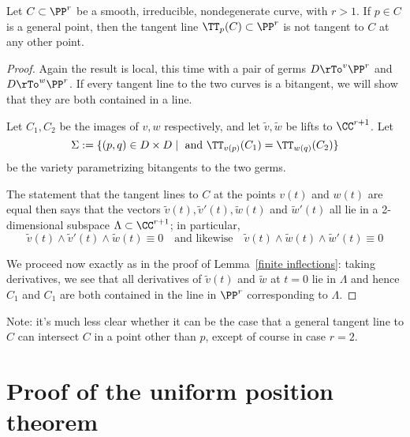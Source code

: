  \begin{lemma}\label{tangent not bitangent}
 Let $C \subset \PP^r$ be a smooth, irreducible, nondegenerate curve, with $r > 1$. If $p \in C$ is a general point, then the tangent line $\TT_p(C) \subset \PP^r$ is not tangent to $C$ at any other point.
 \end{lemma}
 
 \begin{proof} Again the result is local, this time with a pair of germs $D\rTo^v \PP^r$ and $D\rTo^w \PP^r$. If every
 tangent line to the two curves is a bitangent, we will show that they are both contained in a line.
 
  Let $C_1, C_2$ be the images of $v,w$ respectively, and let $\tilde v, \tilde w$ be lifts to $\CC^{r+1}$.
 Let  
 $$
 \Sigma := \{ (p,q) \in D \times D \mid \text{ and }\TT_{v(p)}(C_1) = \TT_{w(q)}(C_2) \}
 $$
 be the variety parametrizing bitangents to the two germs. 
 
 
 
 The statement that the tangent lines to $C$ at the points $v(t)$ and $w(t)$ are equal then says that the vectors $\tilde v(t), \tilde v'(t),\tilde w(t)$ and $\tilde w'(t)$ all lie in a 2-dimensional subspace $\Lambda \subset \CC^{r+1}$; in particular,
 $$
 \tilde v(t) \wedge \tilde v'(t) \wedge \tilde w(t) \equiv 0 \quad \text{and likewise} \quad \tilde v(t) \wedge \tilde w(t) \wedge \tilde w'(t) \equiv 0
 $$
 
We proceed now exactly as in the proof of Lemma~\ref{finite inflections}: taking derivatives, we see that all derivatives of $\tilde v(t)$
and $\tilde w$ at $t=0$ lie in $\Lambda$
and hence $C_1$ and $C_1$ are both contained in the line in $\PP^r$ corresponding to $\Lambda$.
 \end{proof}

Note: it's much less clear whether it can be the case that a general tangent line to $C$ can intersect $C$ in a point other than $p$, except of course in case $r=2$. %

\section{Proof of the uniform position theorem}

